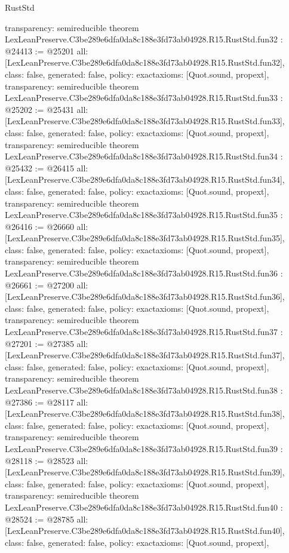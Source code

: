 \begin{lexlean}{RustStd}
\begin{coremodule}
{  transparency: semireducible
}
theorem LexLeanPreserve.C3be289e6dfa0da8c188e3fd73ab04928.R15.RustStd.fun32 : @24413 := @25201 {
  all: [LexLeanPreserve.C3be289e6dfa0da8c188e3fd73ab04928.R15.RustStd.fun32],
  class: false,
  generated: false,
  policy: exact{axioms: [Quot.sound, propext]},
  transparency: semireducible
}
theorem LexLeanPreserve.C3be289e6dfa0da8c188e3fd73ab04928.R15.RustStd.fun33 : @25202 := @25431 {
  all: [LexLeanPreserve.C3be289e6dfa0da8c188e3fd73ab04928.R15.RustStd.fun33],
  class: false,
  generated: false,
  policy: exact{axioms: [Quot.sound, propext]},
  transparency: semireducible
}
theorem LexLeanPreserve.C3be289e6dfa0da8c188e3fd73ab04928.R15.RustStd.fun34 : @25432 := @26415 {
  all: [LexLeanPreserve.C3be289e6dfa0da8c188e3fd73ab04928.R15.RustStd.fun34],
  class: false,
  generated: false,
  policy: exact{axioms: [Quot.sound, propext]},
  transparency: semireducible
}
theorem LexLeanPreserve.C3be289e6dfa0da8c188e3fd73ab04928.R15.RustStd.fun35 : @26416 := @26660 {
  all: [LexLeanPreserve.C3be289e6dfa0da8c188e3fd73ab04928.R15.RustStd.fun35],
  class: false,
  generated: false,
  policy: exact{axioms: [Quot.sound, propext]},
  transparency: semireducible
}
theorem LexLeanPreserve.C3be289e6dfa0da8c188e3fd73ab04928.R15.RustStd.fun36 : @26661 := @27200 {
  all: [LexLeanPreserve.C3be289e6dfa0da8c188e3fd73ab04928.R15.RustStd.fun36],
  class: false,
  generated: false,
  policy: exact{axioms: [Quot.sound, propext]},
  transparency: semireducible
}
theorem LexLeanPreserve.C3be289e6dfa0da8c188e3fd73ab04928.R15.RustStd.fun37 : @27201 := @27385 {
  all: [LexLeanPreserve.C3be289e6dfa0da8c188e3fd73ab04928.R15.RustStd.fun37],
  class: false,
  generated: false,
  policy: exact{axioms: [Quot.sound, propext]},
  transparency: semireducible
}
theorem LexLeanPreserve.C3be289e6dfa0da8c188e3fd73ab04928.R15.RustStd.fun38 : @27386 := @28117 {
  all: [LexLeanPreserve.C3be289e6dfa0da8c188e3fd73ab04928.R15.RustStd.fun38],
  class: false,
  generated: false,
  policy: exact{axioms: [Quot.sound, propext]},
  transparency: semireducible
}
theorem LexLeanPreserve.C3be289e6dfa0da8c188e3fd73ab04928.R15.RustStd.fun39 : @28118 := @28523 {
  all: [LexLeanPreserve.C3be289e6dfa0da8c188e3fd73ab04928.R15.RustStd.fun39],
  class: false,
  generated: false,
  policy: exact{axioms: [Quot.sound, propext]},
  transparency: semireducible
}
theorem LexLeanPreserve.C3be289e6dfa0da8c188e3fd73ab04928.R15.RustStd.fun40 : @28524 := @28785 {
  all: [LexLeanPreserve.C3be289e6dfa0da8c188e3fd73ab04928.R15.RustStd.fun40],
  class: false,
  generated: false,
  policy: exact{axioms: [Quot.sound, propext]},
}
\end{coremodule}
\end{lexlean}
